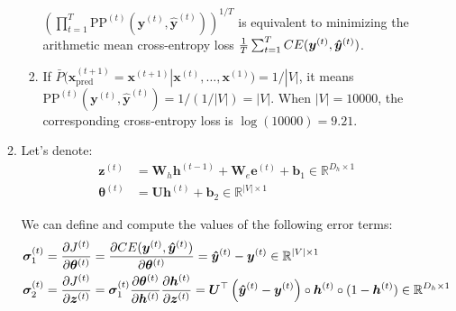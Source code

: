 \documentclass[10pt,reqno]{amsart}
\begin{document}
\begin{enumerate}[topsep=0pt,itemsep=3ex,partopsep=1ex,parsep=1ex]
\begin{enumerate}[itemsep=2ex]
\begin{enumerate}[itemsep=2ex]
        $\left( \prod^T_{t=1} \text{PP}^{(t)}(\bm{y}^{(t)}, \bm{\hat{y}}^{(t)}) \right)^{1/T}$
        is equivalent to minimizing the arithmetic mean cross-entropy loss 
        $\frac{1}{T} \sum^T_{t=1} CE(\bm{y}^{(t)}, \bm{\hat{y}}^{(t)})$. 
      \item
        If $\bar{P}(\bm{x}^{(t+1)}_\text{pred} = \bm{x}^{(t+1)} | \bm{x}^{(t)}, \dots, \bm{x}^{(1)}) = 1/|V|$,
        it means $\text{PP}^{(t)}(\bm{y}^{(t)}, \bm{\hat{y}}^{(t)}) = 1/(1/|V|) = |V|$. 
        When $|V| = 10000$, the corresponding cross-entropy loss is $\log(10000) = 9.21$.
    \end{enumerate}
  \item
    Let's denote:
    \begin{align*}
      \bm{z}^{(t)} &= \bm{W}_h \bm{h}^{(t-1)} + \bm{W}_e \bm{e}^{(t)} + \bm{b}_1 \in \mathbb{R}^{D_h\times1} \\
      \bm{\theta}^{(t)} &= \bm{U} \bm{h}^{(t)} + \bm{b}_2 \in \mathbb{R}^{|V|\times1} 
    \end{align*}

    We can define and compute the values of the following error terms:
    \begin{align*}
      \bm{\sigma}^{(t)}_1 &= \frac{\partial J^{(t)}}{\partial \bm{\theta}^{(t)}}
      = \frac{\partial CE(\bm{y}^{(t)}, \bm{\hat{y}}^{(t)})}{\partial \bm{\theta}^{(t)}}
      = \bm{\hat{y}}^{(t)} - \bm{y}^{(t)} 
      \in \mathbb{R}^{|V|\times1} \\
      \bm{\sigma}^{(t)}_2 &= \frac{\partial J^{(t)}}{\partial \bm{z}^{(t)}}
      = \bm{\sigma}^{(t)}_1 \frac{\partial \bm{\theta}^{(t)}}{\partial \bm{h}^{(t)}} \frac{\partial \bm{h}^{(t)}}{\partial \bm{z}^{(t)}}
      = \bm{U}^\top \left(\bm{\hat{y}}^{(t)} - \bm{y}^{(t)} \right) \circ \bm{h}^{(t)} \circ (1 - \bm{h}^{(t)})
      \in \mathbb{R}^{D_h\times1}
    \end{align*}
    

\end{enumerate}
\end{enumerate}
\end{document}
